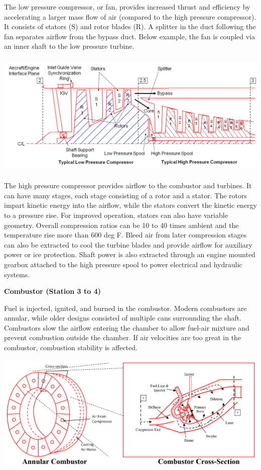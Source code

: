 \documentclass[
]{book}
\begin{document}
The low pressure compressor, or fan, provides increased thrust and efficiency by
accelerating a larger mass flow of air (compared to the high pressure
compressor). It consists of stators (S) and rotor blades (R). A splitter in the
duct following the fan separates airflow from the bypass duct. Below example,
the fan is coupled via an inner shaft to the low pressure turbine.

\includegraphics[width=6.19236in,height=2.33958in]{media/17/image8.png}

The high pressure compressor provides airflow to the combustor and turbines. It
can have many stages, each stage consisting of a rotor and a stator. The rotors
impart kinetic energy into the airflow, while the stators convert the kinetic
energy to a pressure rise. For improved operation, stators can also have variable
geometry. Overall compression ratios can be 10 to 40 times ambient and the
temperature rise more than 600 deg F. Bleed air from later compression stages
can also be extracted to cool the turbine blades and provide airflow for
auxiliary power or ice protection. Shaft power is also extracted through an
engine mounted gearbox attached to the high pressure spool to power electrical
and hydraulic systems.

\textbf{Combustor (Station 3 to 4)}

Fuel is injected, ignited, and burned in the combustor. Modern combustors are
annular, while older designs consisted of multiple cans surrounding the shaft.
Combustors slow the airflow entering the chamber to allow fuel-air mixture and
prevent combustion outside the chamber. If air velocities are too great in the
combustor, combustion stability is affected.

\includegraphics{media/17/combustors.png}
\end{document}
